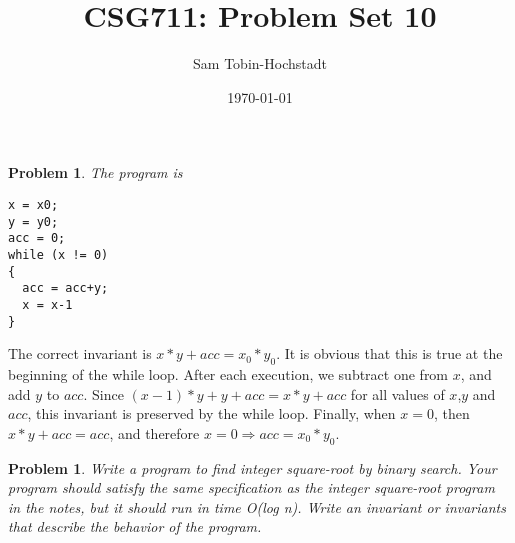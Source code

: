\documentclass[12pt]
{article}
\title{CSG711: Problem Set 10}
\author{Sam Tobin-Hochstadt}
\date{\today}
\newtheorem{problem}[theorem]{Problem}
\newenvironment{solution}[1][Solution]{\begin{trivlist}
\item[\hskip \labelsep {\bfseries #1}]}{\end{trivlist}}
\begin{document}
\maketitle

\begin{problem}
The program is
\begin{verbatim}
x = x0; 
y = y0; 
acc = 0;
while (x != 0) 
{
  acc = acc+y; 
  x = x-1
}
\end{verbatim}
\end{problem}

\begin{solution}
The correct invariant is $x*y + acc = x_0*y_0$.  It is obvious that
this is true at the beginning of the while loop.  After each
execution, we subtract one from $x$, and add $y$ to $acc$.  Since
$(x-1)*y+y+acc = x*y + acc$ for all values of $x$,$y$ and $acc$, this
invariant is preserved by the while loop.  Finally, when $x=0$, then
$x*y + acc = acc$, and therefore $x=0 \Rightarrow acc = x_0*y_0$.
\end {solution}

\begin{problem}
Write a program to find integer square-root by binary search. Your
program should satisfy the same specification as the integer
square-root program in the notes, but it should run in time O(log
n). Write an invariant or invariants that describe the behavior of the
program.
\end {problem}
\end{document}
